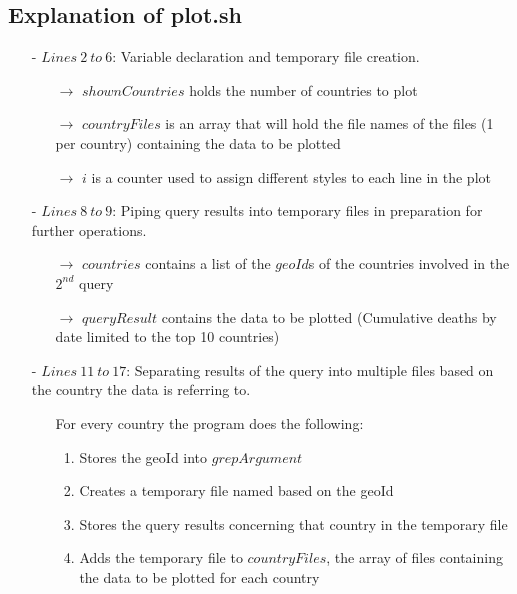 \documentclass{article}
\begin{document}
\subsection{Explanation of plot.sh}
\begin{itemize}
    \item[-]$Lines\ 2\ to\ 6$: Variable declaration and temporary file creation.
    \begin{itemize}
        \item[$\rightarrow$] $shownCountries$ holds the number of countries to plot
        \item[$\rightarrow$] $countryFiles$ is an array that will hold the file names of the files (1 per country) containing the data to be plotted
        \item[$\rightarrow$] $i$ is a counter used to assign different styles to each line in the plot
    \end{itemize}
    \item[-]$Lines\ 8\ to\ 9$: Piping query results into temporary files in preparation for further operations.
    \begin{itemize}
        \item[$\rightarrow$] $countries$ contains a list of the $geoId$s of the countries involved in the $2^{nd}$ query
        \item[$\rightarrow$] $queryResult$ contains the data to be plotted (Cumulative deaths by date limited to the top 10 countries)
    \end{itemize}
    \item[-]$Lines\ 11\ to\ 17$: Separating results of the query into multiple files based on the country the data is referring to.
    \begin{itemize}
        \item[] For every country the program does the following:
        \item[] \begin{enumerate}
                    \item Stores the geoId into $grepArgument$
                    \item Creates a temporary file named based on the geoId
                    \item Stores the query results concerning that country in the temporary file
                    \item Adds the temporary file to $countryFiles$, the array of files containing the data to be plotted for each country
                \end{enumerate}
    \end{itemize}
    

\end{itemize}
\end{document}
